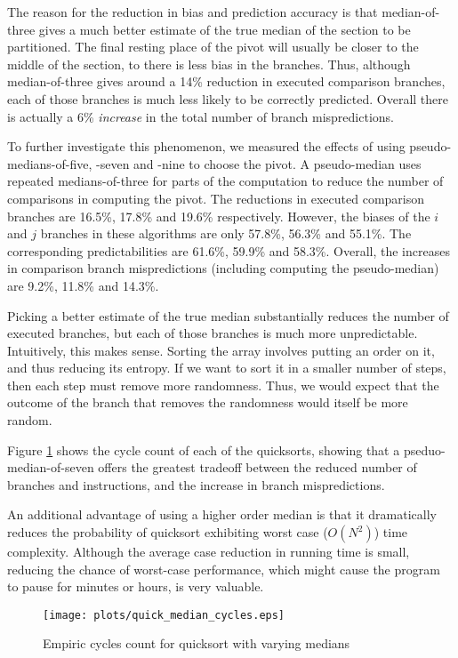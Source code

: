 The reason for the reduction in bias and prediction accuracy is that
median-of-three gives a much better estimate of the true median of the
section to be partitioned. The final resting place of the pivot will
usually be closer to the middle of the section, to there is less bias
in the branches. Thus, although median-of-three gives around a 14\%
reduction in executed comparison branches, each of those branches is
much less likely to be correctly predicted. Overall there is actually
a 6\% \textit{increase} in the total number of branch mispredictions.

To further investigate this phenomenon, we measured the effects of
using pseudo-medians-of-five, -seven and -nine to choose the pivot. A
pseudo-median uses repeated medians-of-three for parts of the
computation to reduce the number of comparisons in computing the
pivot. The reductions in executed comparison branches are 16.5\%,
17.8\% and 19.6\% respectively. However, the biases of the $i$ and $j$
branches in these algorithms are only 57.8\%, 56.3\% and 55.1\%. The
corresponding predictabilities are 61.6\%, 59.9\% and 58.3\%. Overall,
the increases in comparison branch mispredictions (including computing
the pseudo-median) are 9.2\%, 11.8\% and 14.3\%. 

Picking a better estimate of the true median substantially reduces the
number of executed branches, but each of those branches is much more
unpredictable. Intuitively, this makes sense. Sorting the array
involves putting an order on it, and thus reducing its entropy. If we
want to sort it in a smaller number of steps, then each step must
remove more randomness. Thus, we would expect that the outcome of the
branch that removes the randomness would itself be more random.

Figure \ref{quick_median_cycles} shows the cycle count of each of the quicksorts,
showing that a pseduo-median-of-seven offers the greatest tradeoff
between the reduced number of branches and instructions, and the
increase in branch mispredictions.

An additional advantage of using a higher order median is that it
dramatically reduces the probability of quicksort exhibiting worst
case ($O(N^2)$) time complexity. Although the average case reduction
in running time is small, reducing the chance of worst-case
performance, which might cause the program to pause for minutes or
hours, is very valuable.

\begin{figure}
\texttt{[image: plots/quick\_median\_cycles.eps]}
\caption{Empiric cycles count for quicksort with varying medians}
\label{quick_median_cycles}
\end{figure}


